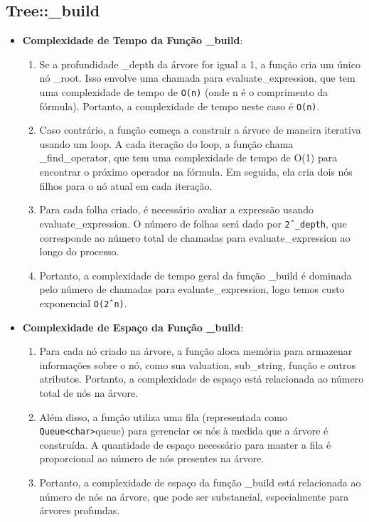 \documentclass{article}
\begin{document}
\subsection{Tree::\_build}
\begin{itemize}
  \item \textbf{Complexidade de Tempo da Função \_build}:
    \begin{enumerate}
      \item Se a profundidade \_depth da árvore for igual a 1, a função cria um único nó \_root. Isso envolve uma chamada para evaluate\_expression, que tem uma complexidade de tempo de \texttt{O(n)} (onde n é o comprimento da fórmula). Portanto, a complexidade de tempo neste caso é \texttt{O(n)}.
      \item Caso contrário, a função começa a construir a árvore de maneira iterativa usando um loop. A cada iteração do loop, a função chama \_find\_operator, que tem uma complexidade de tempo de O(1) para encontrar o próximo operador na fórmula. Em seguida, ela cria dois nós filhos para o nó atual em cada iteração.
      \item Para cada folha criado, é necessário avaliar a expressão usando evaluate\_expression. O número de folhas será dado por \texttt{2ˆ\_depth}, que corresponde ao número total de chamadas para evaluate\_expression ao longo do processo.
      \item Portanto, a complexidade de tempo geral da função \_build é dominada pelo número de chamadas para evaluate\_expression, logo temos custo exponencial \texttt{O(2ˆn)}.
    \end{enumerate}
  \item \textbf{Complexidade de Espaço da Função \_build}:
    \begin{enumerate}
      \item Para cada nó criado na árvore, a função aloca memória para armazenar informações sobre o nó, como sua valuation, sub\_string, função e outros atributos. Portanto, a complexidade de espaço está relacionada ao número total de nós na árvore.
      \item Além disso, a função utiliza uma fila (representada como \texttt{Queue\textless char\textgreater}queue) para gerenciar os nós à medida que a árvore é construída. A quantidade de espaço necessário para manter a fila é proporcional ao número de nós presentes na árvore.
      \item Portanto, a complexidade de espaço da função \_build está relacionada ao número de nós na árvore, que pode ser substancial, especialmente para árvores profundas.
    \end{enumerate}
\end{itemize}
\end{document}
